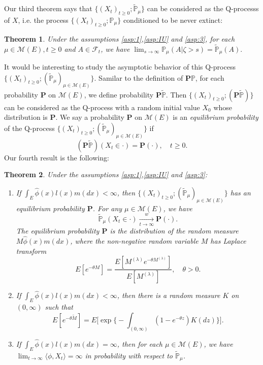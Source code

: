 \documentclass[12pt,a4paper]{amsart}
\numberwithin{equation}{section}
\theoremstyle{plain}
\newtheorem{thm}{Theorem}[section]
\theoremstyle{definition}
\begin{document}
Our third theorem says that $\{(X_t)_{t\geq 0}; \widetilde{\mathbb P}_{\mu}\}$ can be considered as the Q-processs of $X$, i.e. the process $\{(X_t)_{t\geq 0}; \mathbb P_{\mu}\}$ conditioned to be never extinct:
\begin{thm}\label{thm:Q_process}
	Under the assumptions \ref{asp:1},\ref{asp:IU} and \ref{asp:3}, for each  $\mu \in \mathcal M(E), t\geq 0$ and $A\in\mathscr F_t$, we have $\lim_{s\rightarrow\infty}\mathbb P_\mu(A |\zeta>s)=\widetilde{\mathbb P}_\mu(A). $
\end{thm}

It would be interesting to study the asymptotic behavior of this Q-process $\{(X_t)_{t\geq 0}; (\widetilde{\mathbb P}_\mu)_{\mu \in \mathcal M(E)}\}$.
Samilar to the definition of $\mathbf P\mathbb P$, for each probability $\mathbf
P$ on $\mathcal M(E)$, we define probability $\mathbf P\widetilde{\mathbb P}$.
Then $\{(X_t)_{t\geq 0}; (\mathbf P\widetilde{\mathbb P})\}$ can be considered as the Q-process with a random initial value $X_0$ whose distribution is $\mathbf P$.
We say a probability $\mathbf P$ on $\mathcal M(E)$ is an \emph{equilibrium probability} of the Q-process $\{(X_t)_{t\geq 0}; (\widetilde{\mathbb P}_\mu)_{\mu\in\mathcal M(E)}\}$ if
\[
	(\mathbf P\widetilde{\mathbb P})(X_t \in \cdot ) =\mathbf P(\cdot),	\quad t\geq 0.
\]
Our fourth result is the following:
\begin{thm}\label{thm:structure_of_Qprocess}
	Under the assumptions \ref{asp:1},\ref{asp:IU} and \ref{asp:3}:
  \begin{enumerate}
  \item
    If $\int_E\widehat\phi(x)l(x)m(dx)<\infty$, then $\{(X_t)_{t\geq 0};(\widetilde{\mathbb P}_\mu)_{\mu\in\mathcal M(E)}\}$ has an equilibrium probability ${\mathbf P}$.
    For any $\mu\in\mathcal M(E)$, we have
    \[
      \widetilde{\mathbb P}_\mu(X_t \in \cdot ) \xrightarrow[t\to \infty]{w} {\mathbf P}(\cdot).
    \]
    The equilibrium probability $\mathbf P$ is the distribution of the random measure $M\widehat\phi(x)m(dx)$, where the non-negative random variable $M$ has Laplace transform
    \[
      E[e^{-\theta  M}] = \dfrac{E[M^{(\lambda)}e^{-\theta M^{(\lambda)}}]}{E[M^{(\lambda)}]},\quad \theta > 0.
    \]
  \item
    If $\int_E\widehat\phi(x)l(x)m(dx)<\infty$, then there is a random measure $K$ on $(0,\infty)$ such that
    \[
      E[e^{-\theta \widetilde M}] = E\Big[\exp\Big\{- \int_{(0,\infty)} (1-e^{-\theta z }) K(dz) \Big\}\Big].
    \]
  \item
    If $\int_E\widehat\phi(x)l(x)m(dx)=\infty$, then for each $\mu \in \mathcal M(E)$, we have $\lim_{t\rightarrow\infty}\langle \phi, X_t\rangle =\infty$ in probability with respect to $\widetilde{\mathbb P}_\mu$.
  \end{enumerate}
\end{thm}
\end{document}
